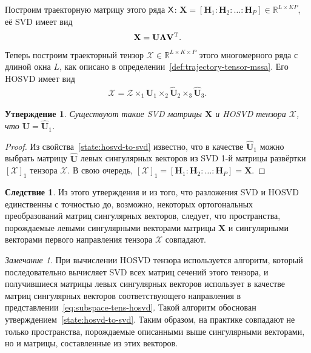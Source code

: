 \documentclass[specialist,
    substylefile = spbu.rtx,
    subf,href,colorlinks=true, 12pt]{disser}
\theoremstyle{plain}
\newtheorem{statement}{Утверждение}[section]
\theoremstyle{definition}
\newtheorem*{corollary}{Следствие}
\theoremstyle{remark}
\newtheorem*{remark}{Замечание}
\begin{document}
    Построим траекторную матрицу этого ряда $\mathsf{X}$:
    $\mathbf{X} = [\mathbf{H}_1: \mathbf{H}_2: \ldots: \mathbf{H}_P] \in \mathbb{R}^{L\times KP}$,
    её SVD имеет вид
    \begin{gather*}
        \mathbf{X} =\mathbf{U} \mathbf{\Lambda} \mathbf{V}^{\mathrm{T}}.
    \end{gather*}
    Теперь построим траекторный тензор $\mathcal{X}\in \mathbb{R}^{L\times K \times P}$ этого многомерного ряда
    с длиной окна $L$, как описано в определении~\ref{def:trajectory-tensor-mssa}.
    Его HOSVD имеет вид
    \begin{gather}
        \mathcal{X}=\mathcal{Z} \times_1 \widehat{\mathbf{U}}_1 \times_2 \widehat{\mathbf{U}}_2
        \times_3 \widehat{\mathbf{U}}_3.
        \label{eq:subspace-tens-hosvd}
    \end{gather}

    \begin{statement}
        Существуют такие \emph{SVD} матрицы $\mathbf{X}$ и \emph{HOSVD} тензора $\mathcal{X}$, что
        $\mathbf{U} = \widehat{\mathbf{U}}_1$.\label{state:tens-mssa-rank}
    \end{statement}

    \begin{proof}
        Из свойства~\ref{state:hosvd-to-svd} известно, что в качестве $\widehat{\mathbf{U}}_1$ можно выбрать матрицу
        $\widehat{\mathbf{U}}$ левых сингулярных векторов из SVD 1-й матрицы развёртки $[\mathcal{X}]_{1}$
        тензора $\mathcal{X}$.
        В свою очередь, $[\mathcal{X}]_{1} = [\mathbf{H}_1: \mathbf{H}_2: \ldots: \mathbf{H}_P] = \mathbf{X}$.
    \end{proof}

    \begin{corollary}
        Из этого утверждения и из того, что разложения SVD и HOSVD единственны с точностью
        до, возможно, некоторых ортогональных преобразований матриц сингулярных векторов,
        следует, что пространства, порождаемые левыми сингулярными векторами матрицы $\mathbf{X}$
        и сингулярными векторами первого направления тензора $\mathcal{X}$ совпадают.
    \end{corollary}

    \begin{remark}
        При вычислении HOSVD тензора используется алгоритм, который последовательно вычисляет SVD всех матриц сечений
        этого тензора, и получившиеся матрицы левых сингулярных векторов использует в качестве матриц сингулярных
        векторов соответствующего направления в представлении~\eqref{eq:subspace-tens-hosvd}.
        Такой алгоритм обоснован утверждением~\ref{state:hosvd-to-svd}.
        Таким образом, на практике совпадают не только пространства, порождаемые описанными выше сингулярными векторами,
        но и матрицы, составленные из этих векторов.
    \end{remark}
\end{document}
